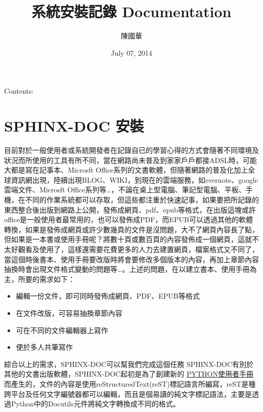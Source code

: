 \documentclass[letterpaper,10pt,english]{sphinxmanual}
\title{系統安裝記錄 Documentation}
\date{July 07, 2014}
\author{陳國華}
\begin{document}
\maketitle
\tableofcontents
{}\label{index::doc}


Contents:


\chapter{SPHINX-DOC 安裝}
\label{_doc/sphinx-doc/index::doc}\label{_doc/sphinx-doc/index:sphinx-doc}\label{_doc/sphinx-doc/index:welcome-to-s-documentation}
目前對於一般使用者或系統開發者在記錄自已的學習心得的方式會隨著不同環境及狀況而所使用的工具有所不同，當在網路尚未普及到家家戶戶都接ADSL時，可能大都是寫在記事本、Microsft Office系列的文書軟體，但隨著網路的普及化加上全球資訊網出現，陸續出現BLOG、WIKI，到現在的雲端服務，如evernote、google雲端文件、Microsft Office系列等…，不論在桌上型電腦、筆記型電腦、平板、手機，在不同的作業系統都可以存取，但這些都注重於快速記事，如果要把所記錄的東西整合後出版到網路上公開，發佈成網頁、pdf、epub等格式，在出版這塊或許office是一般使用者最常用的，也可以發佈成PDF，而EPUB可以透過其他的軟體轉換，如果是發佈成網頁或許少數幾頁的文件是沒問題，大不了網頁內容長了點，但如果是一本書或使用手冊呢？將數十頁或數百頁的內容發佈成一個網頁，這就不太好觀看及使用了，這樣還需要花費更多的人力去建置網頁，檔案格式又不同了，當這個時後書本、使用手冊要改版時將會要修改多個版本的內容，再加上章節內容抽換時會出現文件格式變動的問題等…。上述的問題，在以建立書本、使用手冊為主，所要的需求如下：
\begin{itemize}
\item {} 
編輯一份文件，即可同時發佈成網頁、PDF、EPUB等格式

\item {} 
在文件改版，可容易抽換章節內容

\item {} 
可在不同的文件編輯器上寫作

\item {} 
便於多人共筆寫作

\end{itemize}

綜合以上的需求，SPHINX-DOC可以幫我們完成這個任務
SPHINX-DOC有別於其他的文書出版軟體，SPHINX-DOC起初是為了創建新的 \href{https://doc.python.org/3.5/index.html}{PYTHON使用者手冊} 而產生的，文件的內容是使用reStructuredText(reST)標記語言所編寫，reST是種跨平台及任何文字編號器都可以編輯，而且是個易讀的純文字標記語法，主要是透過Python中的Docutils元件將純文字轉換成不同的格式。
\end{document}
